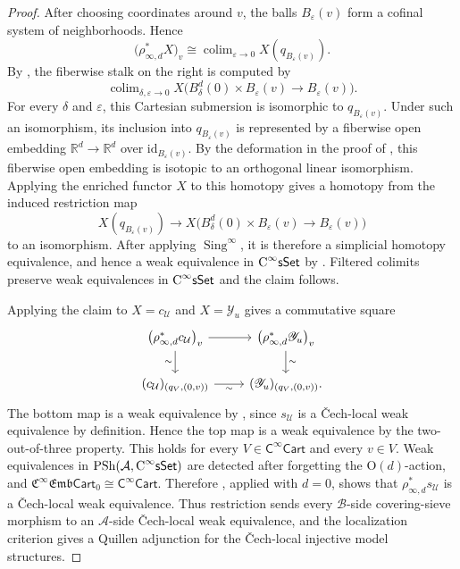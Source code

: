 \documentclass{amsart}
\newcommand{\cat}[1]{\mathsf{#1}}
\newcommand{\sset}{\cat{sSet}}
\newcommand{\id}{\mathrm{id}}
\DeclareMathOperator*{\colim}{colim}
\DeclareMathOperator{\Sing}{Sing}
\newcommand{\CsSet}{\textnormal{C}^{\infty}\sset}
\newcommand{\Cart}{\cat{C}^{\infty}\cat{Cart}}
\newcommand{\fembcart}[1]{\mathfrak{C}^{\infty}\mathfrak{Emb}\cat{Cart}_{#1}}
\newcommand{\psh}{\mathrm{PSh}}
\newcommand{\RR}{{\mathbb{R}}}
\newcommand{\Yo}{\mathscr{Y}}
\theoremstyle{definition}
\numberwithin{equation}{subsection}
\numberwithin{subsubsection}{subsection}
\begin{document}
\begin{proof}
  After choosing coordinates around \(v\), the balls \(B_\varepsilon(v)\)
  form a cofinal system of neighborhoods. Hence
  \[
    \bigl(\rho_{\infty,d}^{*}X\bigr)_v
    \cong
    \colim_{\varepsilon\to0}X(q_{B_\varepsilon(v)}).
  \]
  By
  , the fiberwise stalk on the right
  is computed by
  \[
    \colim_{\delta,\varepsilon\to0}
    X\bigl(B_\delta^d(0)\times B_\varepsilon(v)
    \longrightarrow B_\varepsilon(v)\bigr).
  \]
  For every \(\delta\) and \(\varepsilon\), this Cartesian submersion is
  isomorphic to \(q_{B_\varepsilon(v)}\). Under such an isomorphism, its
  inclusion into \(q_{B_\varepsilon(v)}\) is represented by a fiberwise open
  embedding \(\RR^d\to\RR^d\) over \(\id_{B_\varepsilon(v)}\). By
  the deformation in the proof of , this
  fiberwise open embedding is isotopic to an orthogonal linear isomorphism.
  Applying the enriched functor \(X\) to this homotopy gives a homotopy from
  the induced restriction map
  \[
    X(q_{B_\varepsilon(v)})
    \longrightarrow
    X\bigl(B_\delta^d(0)\times B_\varepsilon(v)
    \longrightarrow B_\varepsilon(v)\bigr)
  \]
  to an isomorphism. After applying \(\Sing^\infty\), it is therefore a
  simplicial homotopy equivalence, and hence a weak equivalence in \(\CsSet\)
  by . Filtered colimits
  preserve weak equivalences in \(\CsSet\) and the claim follows.

  Applying the claim to \(X=c_{\mathcal{U}}\) and \(X=\Yo_u\) gives a
  commutative square
  \[
    \begin{tikzcd}
      \bigl(\rho_{\infty,d}^{*}c_{\mathcal{U}}\bigr)_v
      \ar[r]
      \ar[d,"\sim"']
      &
      \bigl(\rho_{\infty,d}^{*}\Yo_u\bigr)_v
      \ar[d,"\sim"]
      \\
      (c_{\mathcal{U}})_{(q_V,(0,v))}
      \ar[r,"\sim"']
      &
      (\Yo_u)_{(q_V,(0,v))}.
    \end{tikzcd}
  \]
  The bottom map is a weak equivalence by
  , since \(s_{\mathcal{U}}\) is a
  \v{C}ech-local weak equivalence by definition. Hence the top map is a weak
  equivalence by the two-out-of-three property. This holds for every
  \(V\in\Cart\) and every \(v\in V\). Weak equivalences in \(\psh(\mathcal{A},
  \CsSet)\) are
  detected after forgetting the \(\mathrm{O}(d)\)-action, and
  \(\fembcart{0}\cong\Cart\). Therefore
  , applied with \(d=0\), shows that
  \(\rho_{\infty,d}^{*}s_{\mathcal{U}}\) is a \v{C}ech-local weak
  equivalence. Thus restriction sends every
  \(\mathcal{B}\)-side covering-sieve morphism to an
  \(\mathcal{A}\)-side \v{C}ech-local weak equivalence, and the localization
  criterion gives a Quillen adjunction for the \v{C}ech-local injective model
  structures.


\end{proof}
\end{document}
